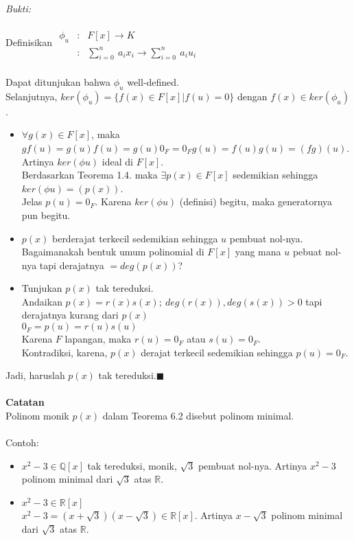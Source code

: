 \\ \textit{Bukti:}
\par Definisikan 
	$\begin{array}{rcl}
	\\ \phi_u&:&F[x] \to K
	\\ &:& \sum^{n}_{i=0} \ a_ix_i \rightarrow \sum^{n}_{i=0} \ a_iu_i
	\end{array}$
\\
\\
Dapat ditunjukan bahwa $\phi_u$ well-defined.
\\ Selanjutnya, $ker(\phi_u) =\{f(x) \in F[x]|f(u)=0\}$ dengan $f(x) \in ker(\phi_u)$.
\begin{itemize}
\item $\forall g(x) \in F[x]$, maka
\\ $gf(u)=g(u)f(u)=g(u)0_F=0_Fg(u)=f(u)g(u)=(fg)(u)$.
\\ Artinya $ker(\phi u)$ ideal di $F[x]$.
\\ Berdasarkan Teorema 1.4. maka $ \exists p(x) \in F[x]$ sedemikian sehingga $ker(\phi u)=(p(x))$.
\\ Jelas $p(u)=0_F$. Karena $ker(\phi u)$ (definisi) begitu, maka generatornya pun begitu.
\item $p(x)$ berderajat terkecil sedemikian sehingga $u$ pembuat nol-nya.
\\ Bagaimanakah bentuk umum polinomial di $F[x]$ yang mana $u$ pebuat nol-nya tapi derajatnya $=deg(p(x))$?
\item Tunjukan $p(x)$ tak tereduksi.
\\ Andaikan $p(x)=r(x)s(x);~deg(r(x)),deg(s(x))>0$ tapi derajatnya kurang dari $p(x)$
\\ $0_F=p(u)=r(u)s(u)$
\\ Karena $F$ lapangan, maka $r(u)=0_F$ atau $s(u)=0_F$.
\\ Kontradiksi, karena, $p(x)$ derajat terkecil sedemikian sehingga $p(u)=0_F$.
\end{itemize}
Jadi, haruslah $p(x)$ tak tereduksi.$\blacksquare$
\\
\\
\textbf{Catatan}
\\
Polinom monik $p(x)$ dalam Teorema 6.2 disebut polinom minimal.
\\
\\ Contoh:
\begin{itemize}
\item $x^2-3 \in \mathbb{Q}[x]$ tak tereduksi, monik, $\sqrt{3}$ pembuat nol-nya. Artinya $x^2-3$ polinom minimal dari $\sqrt{3}$ atas $\mathbb{R}$. 
\item $x^2-3 \in \mathbb{R}[x]$
\\ $x^2-3=(x+\sqrt{3})(x-\sqrt{3}) \in \mathbb{R}[x]$. Artinya $x-\sqrt{3}$ polinom minimal dari $\sqrt{3}$ atas $\mathbb{R}$.
\end{itemize}

